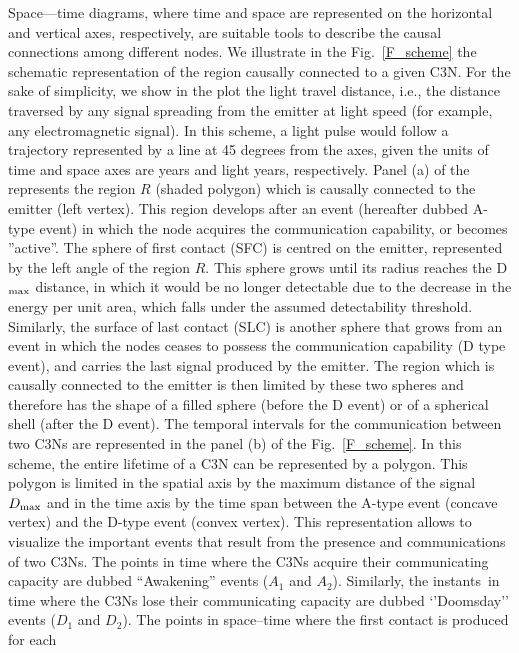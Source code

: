 \documentclass[crop]{CSLB}
\newcommand{\ceti}{C3N}
\newcommand{\cetis}{C3Ns}
\newcommand{\ffn}[1]{}
\begin{document}
\ffn{1} Space—time diagrams, where time and space are represented on
the horizontal and vertical axes, respectively, are suitable tools to
describe the causal connections among different nodes.
%
We illustrate in the Fig.~\ref{F_scheme} the schematic representation
of the region causally connected to a given \ceti{}.
%
For the sake of simplicity, we show in the plot the light travel
distance, i.e., the distance traversed by any signal spreading from
the emitter at light speed (for example, any electromagnetic signal).
%
In this scheme, a light pulse would follow a trajectory represented by
a line at 45 degrees from the axes, given the units of time and
space axes are years and light years, respectively.
%
Panel (a) of the represents the region $R$ (shaded polygon)
which is causally connected to the emitter (left vertex).
%
This region develops after an event (hereafter dubbed A-type event) in
which the node acquires the communication capability, or becomes
''active''.
%
The sphere of first contact (SFC) is centred on the emitter,
represented by the left angle of the region $R$.
%
This sphere grows until its radius reaches the D$_{\rm max}$ distance, in
which it would be no longer detectable due to the decrease in the
energy per unit area, which falls under the assumed detectability
threshold.
%
Similarly, the surface of last contact (SLC) is another sphere that
grows from an event in which the nodes ceases to possess the
communication capability (D type event), and carries the last signal
produced by the emitter.
%
The region which is causally connected to the emitter is then limited
by these two spheres and therefore has the shape of a filled sphere
(before the D event) or of a spherical shell (after the D event).
%
The temporal intervals for the communication between two \cetis{} are
represented in the panel (b) of the Fig.~\ref{F_scheme}.
%
In this scheme, the entire lifetime of a \ceti{} can be represented by
a polygon.
%
This polygon is limited in the spatial axis by the maximum distance of
the signal $D_{\rm max}$ and in the time axis by the time span between the
A-type event (concave vertex) and the D-type event (convex vertex).
%
This representation allows to visualize the important events that
result from the presence and communications of two \cetis{}.
%
The points in time where the \cetis{} acquire their communicating
capacity are dubbed ``Awakening'' events ($A_1$ and $A_2$).
%
Similarly, the instants in time where the \cetis{} lose their
communicating capacity are dubbed ‘’Doomsday’’ events ($D_1$ and $D_2$).
%
The points in space--time where the first contact is produced for each
\end{document}

